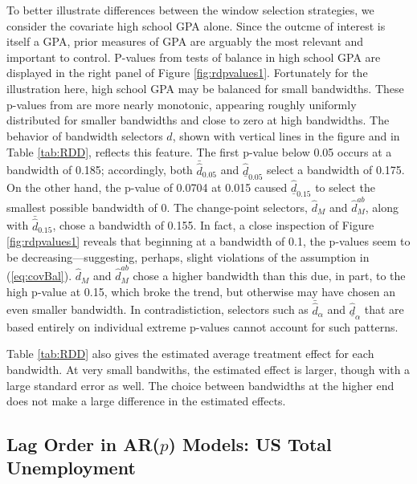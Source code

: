 \documentclass[12pt]{article}\usepackage[]{graphicx}\usepackage[]{color}
\newcommand{\dalphaU}{\bar{\hat{d}}_\alpha}
\newcommand{\dalphaB}{\underline{\hat{d}}_\alpha}
\newcommand{\dhat}{\hat{d}}
\newcommand{\dhatU}{\bar{\hat{d}}}
\newcommand{\dhatB}{\underline{\hat{d}}}
\newcommand{\dhatm}{\hat{d}_M}
\newcommand{\dhatmab}{\hat{d}^{ab}_M}
\begin{document}
To better illustrate differences between the window selection
strategies, we consider the covariate high school GPA alone.
Since the outcme of interest is itself a GPA, prior measures of GPA
are arguably the most relevant and important to control.
P-values from tests of balance in high school GPA are
displayed in the right panel of Figure \ref{fig:rdpvalues1}.
Fortunately for the illustration here, high school GPA may be
balanced for small bandwidths.
These p-values from are more nearly
monotonic, appearing roughly uniformly distributed for smaller
bandwidths and close to zero at high bandwidths.
The behavior of bandwidth selectors $\dhat$, shown with vertical lines
in the figure and in Table \ref{tab:RDD}, reflects this feature.
The first p-value below 0.05 occurs at a bandwidth of
0.185; accordingly, both $\dhatU_{0.05}$ and
$\dhatB_{0.05}$ select a bandwidth of 0.175.
On the other hand, the p-value of 0.0704 at 0.015
caused $\dhatB_{0.15}$ to select the smallest possible bandwidth of 0.
The change-point selectors, $\dhatm$ and $\dhatmab$, along with
$\dhatU_{0.15}$, chose a bandwidth of 0.155.
In fact, a close inspection of Figure \ref{fig:rdpvalues1} reveals
that beginning at a bandwidth of 0.1, the p-values seem to be
decreasing---suggesting, perhaps, slight violations of the assumption
in (\ref{eq:covBal}).
$\dhatm$ and $\dhatmab$ chose a higher bandwidth than this due, in
part, to the high p-value at 0.15, which broke the trend, but
otherwise may have chosen an even smaller bandwidth.
In contradistiction, selectors such as $\dalphaU$ and $\dalphaB$ that
are based entirely on individual extreme p-values cannot account for
such patterns.

Table \ref{tab:RDD} also gives the estimated average treatment effect
for each bandwidth.
At very small bandwiths, the estimated effect is larger, though with a
large standard error as well.
The choice between bandwidths at the higher end does not make a large
difference in the estimated effects.

\subsection{Lag Order in AR($p$) Models: US Total Unemployment}


\end{document}
